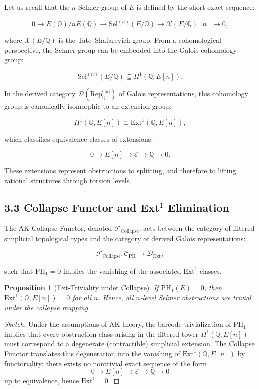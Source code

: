 \documentclass[11pt]{article}
\newtheorem{proposition}[theorem]{Proposition}
\newcommand{\Sha}{\mathcal{X}}
\begin{document}
Let us recall that the $n$-Selmer group of $E$ is defined by the short exact sequence:

\[
0 \to E(\mathbb{Q})/nE(\mathbb{Q}) \to \mathrm{Sel}^{(n)}(E/\mathbb{Q}) \to \Sha(E/\mathbb{Q})[n] \to 0,
\]

where $\Sha(E/\mathbb{Q})$ is the Tate–Shafarevich group.  
From a cohomological perspective, the Selmer group can be embedded into the Galois cohomology group:

\[
\mathrm{Sel}^{(n)}(E/\mathbb{Q}) \subseteq H^1(\mathbb{Q},E[n]).
\]

In the derived category $\mathcal{D}(\mathrm{Rep}_{\mathbb{Q}}^{\mathrm{Gal}})$ of Galois representations, this cohomology group is canonically isomorphic to an extension group:

\[
H^1(\mathbb{Q},E[n]) \cong \mathrm{Ext}^1(\mathbb{Q},E[n]),
\]

which classifies equivalence classes of extensions:

\[
0 \to E[n] \to \mathcal{E} \to \mathbb{Q} \to 0.
\]

These extensions represent obstructions to splitting, and therefore to lifting rational structures through torsion levels.

\subsection{3.3 Collapse Functor and Ext$^1$ Elimination}

The AK Collapse Functor, denoted $\mathcal{F}_{\mathrm{Collapse}}$, acts between the category of filtered simplicial topological types and the category of derived Galois representations:

\[
\mathcal{F}_{\mathrm{Collapse}}: \mathcal{C}_{\mathrm{PH}} \to \mathcal{D}_{\mathrm{Ext}},
\]

such that $\mathrm{PH}_1 = 0$ implies the vanishing of the associated $\mathrm{Ext}^1$ classes.

\begin{proposition}[Ext-Triviality under Collapse]
\label{prop:ext-collapse}
If $\mathrm{PH}_1(E) = 0$, then $\mathrm{Ext}^1(\mathbb{Q},E[n]) = 0$ for all $n$.  
Hence, all $n$-level Selmer obstructions are trivial under the collapse mapping.
\end{proposition}

\begin{proof}[Sketch]
Under the assumptions of AK theory, the barcode trivialization of $\mathrm{PH}_1$ implies that every obstruction class arising in the filtered tower $H^1(\mathbb{Q},E[n])$ must correspond to a degenerate (contractible) simplicial extension.  
The Collapse Functor translates this degeneration into the vanishing of $\mathrm{Ext}^1(\mathbb{Q},E[n])$ by functoriality: there exists no nontrivial exact sequence of the form
\[
0 \to E[n] \to \mathcal{E} \to \mathbb{Q} \to 0
\]
up to equivalence, hence $\mathrm{Ext}^1 = 0$.
\end{proof}
\end{document}
